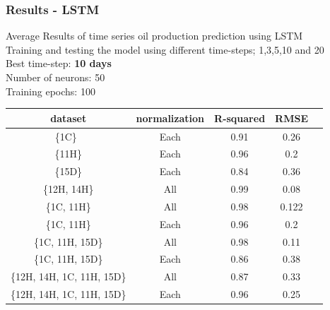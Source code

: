 \documentclass[xcolor=table]{beamer}
\begin{document}
\begin{frame}
\frametitle{Results - LSTM}
 \begin{block}{}
Average Results of time series oil production prediction using LSTM\\
Training and testing the model using different time-steps; 1,3,5,10 and 20\\
Best time-step: \textbf{10 days}\\
Number of neurons: 50\\
Training epochs: 100
\end{block}

 \begin{table}[H]
 \begin{adjustbox}{width=0.8\linewidth,center}
 
 		\begin{tabular}{ccccc}
 			\toprule
 			\multicolumn{1}{c}{dataset}&\multicolumn{1}{c}{normalization}&\multicolumn{1}{c}{R-squared}&\multicolumn{1}{c}{RMSE}\tabularnewline
 			\midrule
 			\{1C\}\ & Each &  0.91 & 0.26 \tabularnewline
			\{11H\} & Each &  0.96 & 0.2 \tabularnewline
			\{15D\} & Each &  0.84 & 0.36\tabularnewline
			\{12H, 14H\} & All &\cellcolor{green!40}0.99 & 0.08 \tabularnewline
			\{1C, 11H\} & All &\cellcolor{green!40} 0.98 & 0.122\tabularnewline
			\{1C, 11H\} & Each & 0.96 & 0.2\tabularnewline
			\{1C, 11H, 15D\} & All &\cellcolor{green!40} 0.98 & 0.11\tabularnewline
			\{1C, 11H, 15D\}  & Each &  0.86 & 0.38 \tabularnewline
			\{12H, 14H, 1C, 11H, 15D\}& All &  0.87 & 0.33\tabularnewline
			\{12H, 14H, 1C, 11H, 15D\} & Each &  0.96 & 0.25\tabularnewline 			
			\bottomrule
 	\end{tabular}
	\end{adjustbox}
 \end{table}
 
\end{frame}
\end{document}
